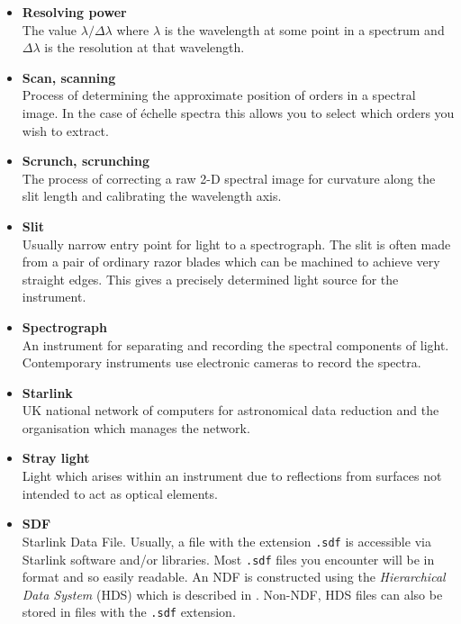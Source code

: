 \documentclass[twoside,11pt]{starlink}
\begin{document}
\begin{itemize}
\item {\bf\label{gl_resolving_power}Resolving power}\\
      The value $\lambda/\Delta\lambda$ where $\lambda$ is the wavelength
      at some point in a spectrum and $\Delta\lambda$ is the resolution
      at that wavelength.

\item {\bf\label{gl_scanning}Scan, scanning}\\
      Process of determining the approximate position of orders in a
      spectral image.  In the case of \'{e}chelle spectra this allows
      you to select which orders you wish to extract.

\item {\bf\label{gl_scrunch}Scrunch, scrunching}\\
      The process of correcting a raw 2-D spectral image for curvature
      along the slit length and calibrating the wavelength axis.

\item {\bf\label{gl_slit}Slit}\\
      Usually narrow entry point for light to a spectrograph.
      The slit is often made from a pair of ordinary razor blades which can
      be machined to achieve very straight edges.  This gives a precisely
      determined light source for the instrument.

\item {\bf\label{gl_spectrograph}Spectrograph}\\
      An instrument for separating and recording the spectral components of
      light.  Contemporary instruments use electronic cameras to record the
      spectra.

\item {\bf\label{gl_starlink}Starlink}\\
      UK national network of computers for astronomical data reduction
      and the organisation which manages the network.

\item {\bf\label{gl_stray_light}Stray light}\\
      Light which arises within an instrument due to reflections from
      surfaces not intended to act as optical elements.

\item {\bf\label{gl_sdf}SDF}\\
      Starlink Data File.  Usually, a file with the extension \verb+.sdf+
      is accessible via Starlink software and/or libraries.
      Most \verb+.sdf+ files you encounter will be in 
      format and so easily readable.  An NDF is constructed using the
      {\sl Hierarchical Data System} (HDS) which is described in
      \cite{hds}.
      Non-NDF, HDS files can also be stored in
      files with the \verb+.sdf+ extension.


\end{itemize}
\end{document}
